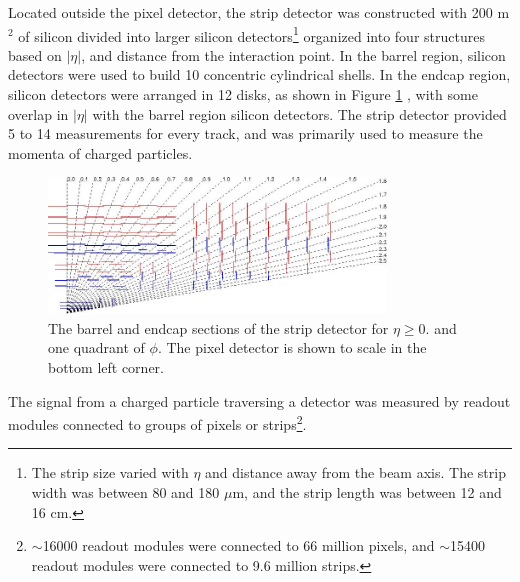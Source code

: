 Located outside the pixel detector, the strip detector was constructed with 200 m$^{2}$ of silicon divided into larger silicon detectors\footnote{The strip size varied with $\eta$ and 
distance away from the beam axis.  The strip width was between 80 and 180 $\mu$m, and the strip length was between 12 and 16 cm.} organized 
into four structures based on $|\eta|$, and distance from the interaction point.  In the barrel region, silicon detectors 
were used to build 10 concentric cylindrical shells.  In the endcap region, silicon detectors 
were arranged in 12 disks, as shown in Figure \ref{fig:stripTracker} \cite{cmsTDR}, with some overlap in $|\eta|$ with the 
barrel region silicon detectors.  The strip detector provided 5 to 14 measurements for every track, and was primarily used to 
measure the momenta of charged particles.

\begin{figure}[ht]
	\centering
	\includegraphics[width=0.8\textwidth]{figures/siliconStripAndPixelDetectorTwoDimView.png}
	\caption{The barrel and endcap sections of the strip detector for $\eta \geq 0.$ and one quadrant of $\phi$.  
	The pixel detector is shown to scale in the bottom left corner.}
	\label{fig:stripTracker}
\end{figure}

The signal from a charged particle traversing a detector was measured by readout modules connected to groups of pixels or 
strips\footnote{$\sim$16000 readout modules were connected to 66 million pixels, and $\sim$15400 readout modules were connected 
to 9.6 million strips.}.

